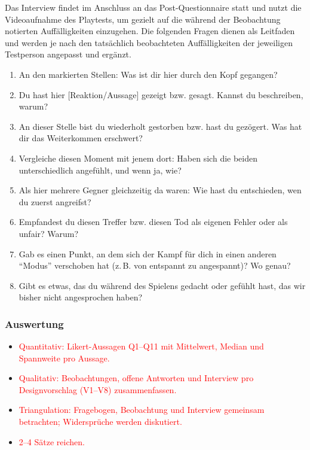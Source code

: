\documentclass[../Main.tex]{subfiles}
\begin{document}
Das Interview findet im Anschluss an das Post-Questionnaire statt und nutzt die Videoaufnahme des Playtests, um gezielt auf die während der Beobachtung notierten Auffälligkeiten einzugehen. Die folgenden Fragen dienen als Leitfaden und werden je nach den tatsächlich beobachteten Auffälligkeiten der jeweiligen Testperson angepasst und ergänzt.
 
\begin{enumerate}[label=\textbf{I\arabic*}, leftmargin=1.5cm, itemsep=0.5em]
    \item An den markierten Stellen: Was ist dir hier durch den Kopf gegangen?
    \item Du hast hier [Reaktion/Aussage] gezeigt bzw. gesagt. Kannst du beschreiben, warum?
    \item An dieser Stelle bist du wiederholt gestorben bzw. hast du gezögert. Was hat dir das Weiterkommen erschwert?
    \item Vergleiche diesen Moment mit jenem dort: Haben sich die beiden unterschiedlich angefühlt, und wenn ja, wie?
    \item Als hier mehrere Gegner gleichzeitig da waren: Wie hast du entschieden, wen du zuerst angreifst?
    \item Empfandest du diesen Treffer bzw. diesen Tod als eigenen Fehler oder als unfair? Warum?
    \item Gab es einen Punkt, an dem sich der Kampf für dich in einen anderen \enquote{Modus} verschoben hat (z.\,B. von entspannt zu angespannt)? Wo genau?
    \item Gibt es etwas, das du während des Spielens gedacht oder gefühlt hast, das wir bisher nicht angesprochen haben?
\end{enumerate}

\subsubsection{Auswertung} \label{sec:Auswertung}

\begin{itemize}[leftmargin=1.5cm]
    \item \textcolor{red}{Quantitativ: Likert-Aussagen Q1--Q11 mit Mittelwert, Median und Spannweite pro Aussage.}
    \item \textcolor{red}{Qualitativ: Beobachtungen, offene Antworten und Interview pro Designvorschlag (V1--V8) zusammenfassen.}
    \item \textcolor{red}{Triangulation: Fragebogen, Beobachtung und Interview gemeinsam betrachten; Widersprüche werden diskutiert.}
    \item \textcolor{red}{2--4 Sätze reichen.}
\end{itemize}
\end{document}
